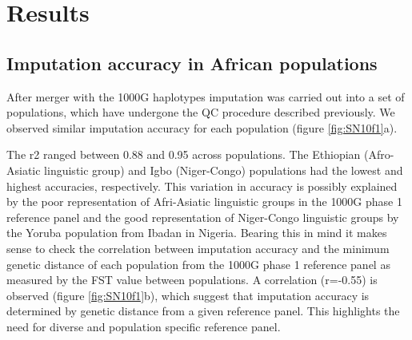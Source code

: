 \section{Results}
\label{sec:rp_results}


\subsection{Imputation accuracy in African populations}

After merger with the \gls{1000G} haplotypes imputation was carried out into a set of populations, which have undergone the \gls{QC} procedure described previously. We observed similar imputation accuracy for each population (figure \ref{fig:SN10f1}a).

The \gls{r2} ranged between 0.88 and 0.95 across populations. The Ethiopian (Afro-Asiatic linguistic group) and Igbo (Niger-Congo) populations had the lowest and highest accuracies, respectively. This variation in accuracy is possibly explained by the poor representation of Afri-Asiatic linguistic groups in the \gls{1000G} phase 1 reference panel and the good representation of Niger-Congo linguistic groups by the Yoruba population from Ibadan in Nigeria. Bearing this in mind it makes sense to check the correlation between imputation accuracy and the minimum genetic distance of each population from the \gls{1000G} phase 1 reference panel as measured by the \gls{FST} value between populations. A correlation (r=-0.55) is observed (figure \ref{fig:SN10f1}b), which suggest that imputation accuracy is determined by genetic distance from a given reference panel. This highlights the need for diverse and population specific reference panel.


